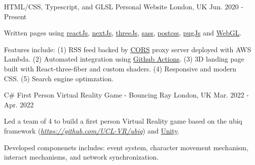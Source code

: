 

\begin{cventries}

  \cventry
    {HTML/CSS, Typescript, and GLSL} %
    {Personal Website} %
    {London, UK} %
    {Jun. 2020 - Present} %
    {
      \begin{cvitems} %
        \item {Written pages using \href{https://reactjs.org/}{reactJs}, \href{https://nextjs.org/}{nextJs}, \href{https://threejs.org/}{threeJs}, \href{https://sass-lang.com/}{sass},  \href{https://postcss.org/}{postcss}, \href{https://pugjs.org/api/getting-started.html}{pugJs} and \href{https://www.khronos.org/webgl/}{WebGL}.}
        \item {Features include: (1) RSS feed backed by \href{https://developer.mozilla.org/en-US/docs/Web/HTTP/CORS}{CORS} proxy server deployed with AWS Lambda. (2) Automated integration using \href{https://github.com/features/actions}{Github Actions}. (3) 3D landing page built with React-three-fiber and custom shaders. (4) Responsive and modern CSS. (5) Search engine optimzation.}
      \end{cvitems}
    }

  \cventry
    {C\#} %
    {First Person Virtual Reality Game - Bouncing Ray} %
    {London, UK} %
    {Mar. 2022 - Apr. 2022} %
    {
      \begin{cvitems} %
        \item {Led a team of 4 to build a first person Virtual Reality game based on the ubiq framework (\href{https://github.com/UCL-VR/ubiq}{\textit{https://github.com/UCL-VR/ubiq}}) and \href{https://unity.com/}{Unity}.}
        \item {Developed componenets includes: event system, character movement mechanism, interact mechanisms, and network synchronization.}
      \end{cvitems}
    }


\end{cventries}
